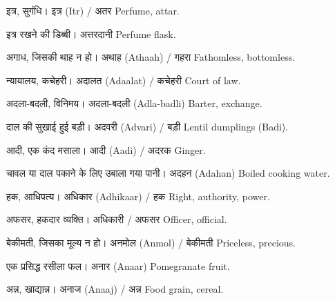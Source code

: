 %
{इत्र, सुगंधि।}%
{इत्र (Itr) / अतर}%
{Perfume, attar.}

%
{इत्र रखने की डिब्बी।}%
{अत्तरदानी}%
{Perfume flask.}

%
{अगाध, जिसकी थाह न हो।}%
{अथाह (Athaah) / गहरा}%
{Fathomless, bottomless.}

%
{न्यायालय, कचेहरी।}%
{अदालत (Adaalat) / कचेहरी}%
{Court of law.}

%
{अदला-बदली, विनिमय।}%
{अदला-बदली (Adla-badli)}%
{Barter, exchange.}

%
{दाल की सुखाई हुई बड़ी।}%
{अदवरी (Advari) / बड़ी}%
{Lentil dumplings (Badi).}

%
{आदी, एक कंद मसाला।}%
{आदी (Aadi) / अदरक}%
{Ginger.}

%
{चावल या दाल पकाने के लिए उबाला गया पानी।}%
{अदहन (Adahan)}%
{Boiled cooking water.}

%
{हक, आधिपत्य।}%
{अधिकार (Adhikaar) / हक}%
{Right, authority, power.}

%
{अफसर, हकदार व्यक्ति।}%
{अधिकारी / अफसर}%
{Officer, official.}

%
{बेकीमती, जिसका मूल्य न हो।}%
{अनमोल (Anmol) / बेकीमती}%
{Priceless, precious.}

%
{एक प्रसिद्ध रसीला फल।}%
{अनार (Anaar)}%
{Pomegranate fruit.}

%
{अन्न, खाद्यान्न।}%
{अनाज (Anaaj) / अन्न}%
{Food grain, cereal.}

